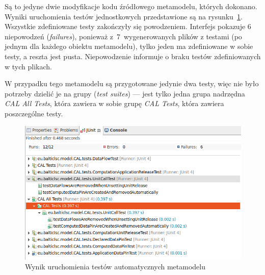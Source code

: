 Są to jedyne dwie modyfikacje kodu źródłowego metamodelu, których dokonano.
Wyniki uruchomienia testów jednostkowych przedstawione są na
rysunku~\ref{rys:sirius-desktop-metamodel-tests}. Wszystkie zdefiniowane testy
zakończyły się powodzeniem. Interfejs pokazuje 6 niepowodzeń (\emph{failures}),
ponieważ z~7~wygenerowanych plików z testami (po jednym dla każdego obiektu
metamodelu), tylko jeden ma zdefiniowane w sobie testy, a reszta jest pusta.
Niepowodzenie informuje o braku testów zdefiniowanych w tych plikach.

W przypadku tego metamodelu są przygotowane
jedynie dwa testy, więc nie było potrzeby dzielić je na grupy
(\emph{test suites}) --- jest tylko
jedna grupa nadrzędna \emph{CAL All Tests}, która
zawiera w sobie grupę
\emph{CAL Tests}, która zawiera poszczególne testy.

\begin{figure}[!hb]
	\centering

	\includegraphics[width=0.95\linewidth]{./images/sirius-desktop-metamodel-tests.png}
	\caption{Wynik uruchomienia testów automatycznych
  metamodelu}\label{rys:sirius-desktop-metamodel-tests}
\end{figure}
